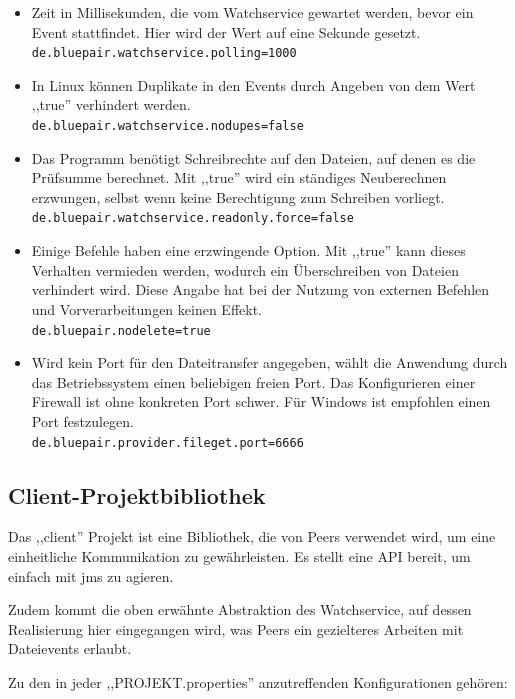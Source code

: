 \documentclass[oneside, ngerman, toc=bibliography,bibliography=totoc,listof=entryprefix, open=right,numbers=noenddot,fontsize=12pt]{scrbook}
\begin{document}
\begin{itemize}
    \item Zeit in Millisekunden, die vom Watchservice gewartet werden, bevor ein Event stattfindet. Hier wird der Wert auf eine Sekunde gesetzt.\\ \verb|de.bluepair.watchservice.polling=1000|

\item In Linux können Duplikate in den Events durch Angeben von dem Wert ,,true'' verhindert werden. \\
\verb|de.bluepair.watchservice.nodupes=false|

\item Das Programm benötigt Schreibrechte auf den Dateien, auf denen es die  Prüfsumme berechnet. Mit ,,true'' wird ein ständiges Neuberechnen erzwungen, selbst wenn keine Berechtigung zum Schreiben vorliegt.\\
\verb|de.bluepair.watchservice.readonly.force=false|

\item Einige Befehle haben eine erzwingende Option.
Mit ,,true'' kann dieses Verhalten vermieden werden, wodurch ein Überschreiben von Dateien verhindert wird. Diese Angabe hat bei der Nutzung von externen Befehlen und Vorverarbeitungen  keinen Effekt.\\
\verb|de.bluepair.nodelete=true|

\item Wird kein Port für den Dateitransfer angegeben, wählt die Anwendung durch das Betriebssystem einen beliebigen freien Port. Das Konfigurieren einer Firewall ist ohne konkreten Port schwer. Für Windows ist empfohlen einen Port festzulegen.\\
\verb|de.bluepair.provider.fileget.port=6666|
\end{itemize}

\subsection{Client-Projektbibliothek}

Das ,,client'' Projekt ist eine Bibliothek, die von Peers verwendet wird, um eine einheitliche Kommunikation zu gewährleisten. Es stellt eine API bereit, um einfach mit \acrshort{jms} zu agieren.

Zudem kommt die oben erwähnte Abstraktion des Watchservice, auf dessen Realisierung hier eingegangen wird, was Peers ein gezielteres Arbeiten mit Dateievents erlaubt.

Zu den in jeder ,,PROJEKT.properties'' anzutreffenden Konfigurationen gehören:
\end{document}
